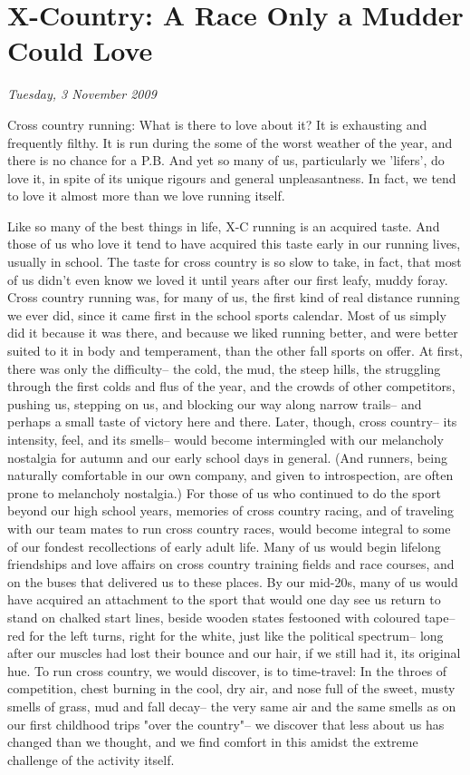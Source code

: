 \chapter{X-Country: A Race Only a Mudder Could Love}
\textit{Tuesday, 3 November 2009}
\bigskip

Cross country running: What is there to love about it? It is exhausting and frequently filthy. It is run during the some of the worst weather of the year, and there is no chance for a P.B. And yet so many of us, particularly we 'lifers', do love it, in spite of its unique rigours and general unpleasantness. In fact, we tend to love it almost more than we love running itself.

Like so many of the best things in life, X-C running is an acquired taste. And those of us who love it tend to have acquired this taste early in our running lives, usually in school. The taste for cross country is so slow to take, in fact, that most of us didn't even know we loved it until years after our first leafy, muddy foray. Cross country running was, for many of us, the first kind of real distance running we ever did, since it came first in the school sports calendar. Most of us simply did it because it was there, and because we liked running better, and were better suited to it in body and temperament, than the other fall sports on offer. At first, there was only the difficulty-- the cold, the mud, the steep hills, the struggling through the first colds and flus of the year, and the crowds of other competitors, pushing us, stepping on us, and blocking our way along narrow trails-- and perhaps a small taste of victory here and there. Later, though, cross country-- its intensity, feel, and its smells-- would become intermingled with our melancholy nostalgia for autumn and our early school days in general. (And runners, being naturally comfortable in our own company, and given to introspection, are often prone to melancholy nostalgia.) For those of us who continued to do the sport beyond our high school years, memories of cross country racing, and of traveling with our team mates to run cross country races, would become integral to some of our fondest recollections of early adult life. Many of us would begin lifelong friendships and love affairs on cross country training fields and race courses, and on the buses that delivered us to these places. By our mid-20s, many of us would have acquired an attachment to the sport that would one day see us return to stand on chalked start lines, beside wooden states festooned with coloured tape-- red for the left turns, right for the white, just like the political spectrum-- long after our muscles had lost their bounce and our hair, if we still had it, its original hue. To run cross country, we would discover, is to time-travel: In the throes of competition, chest burning in the cool, dry air, and nose full of the sweet, musty smells of grass, mud and fall decay-- the very same air and the same smells as on our first childhood trips "over the country"-- we discover that less about us has changed than we thought, and we find comfort in this amidst the extreme challenge of the activity itself.


